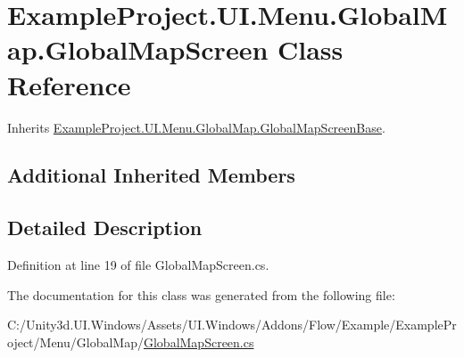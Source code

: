 \hypertarget{class_example_project_1_1_u_i_1_1_menu_1_1_global_map_1_1_global_map_screen}{}\section{Example\+Project.\+U\+I.\+Menu.\+Global\+Map.\+Global\+Map\+Screen Class Reference}
\label{class_example_project_1_1_u_i_1_1_menu_1_1_global_map_1_1_global_map_screen}


Inherits \hyperlink{class_example_project_1_1_u_i_1_1_menu_1_1_global_map_1_1_global_map_screen_base}{Example\+Project.\+U\+I.\+Menu.\+Global\+Map.\+Global\+Map\+Screen\+Base}.

\subsection*{Additional Inherited Members}


\subsection{Detailed Description}


Definition at line 19 of file Global\+Map\+Screen.\+cs.



The documentation for this class was generated from the following file\+:\begin{DoxyCompactItemize}
\item 
C\+:/\+Unity3d.\+U\+I.\+Windows/\+Assets/\+U\+I.\+Windows/\+Addons/\+Flow/\+Example/\+Example\+Project/\+Menu/\+Global\+Map/\hyperlink{_global_map_screen_8cs}{Global\+Map\+Screen.\+cs}\end{DoxyCompactItemize}

